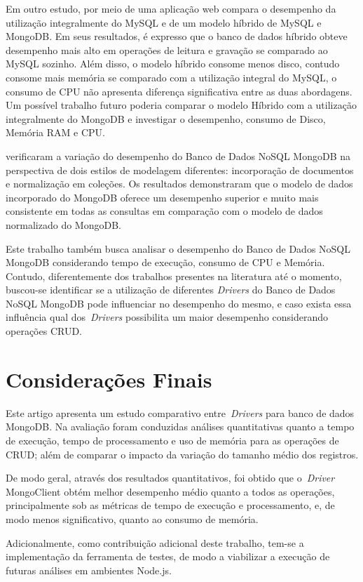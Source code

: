 \documentclass[12pt]{article}
\begin{document}
Em outro estudo, \cite{ongo:2018} por meio de uma aplicação web compara o desempenho da utilização integralmente do MySQL e de um modelo híbrido de MySQL e MongoDB. Em seus resultados, é expresso que o banco de dados híbrido obteve desempenho mais alto em operações de leitura e gravação se comparado ao MySQL sozinho. Além disso, o modelo híbrido consome menos disco, contudo consome mais memória se comparado com a utilização integral do MySQL, o consumo de CPU não apresenta diferença significativa entre as duas abordagens. Um possível trabalho futuro poderia comparar o modelo Híbrido com a utilização integralmente do MongoDB e investigar o desempenho, consumo de Disco, Memória RAM e CPU.

\cite{kanade2014study} verificaram a variação do desempenho do Banco de Dados NoSQL MongoDB na perspectiva de dois estilos de modelagem diferentes: incorporação de documentos e normalização em coleções. Os resultados demonstraram que o modelo de dados incorporado do MongoDB oferece um desempenho superior e muito mais consistente em todas as consultas em comparação com o modelo de dados normalizado do MongoDB.

Este trabalho também busca analisar o desempenho do Banco de Dados NoSQL MongoDB considerando tempo de execução, consumo de CPU e Memória. Contudo, diferentemente dos trabalhos presentes na literatura até o momento, buscou-se identificar se a utilização de diferentes \emph{Drivers} do Banco de Dados NoSQL MongoDB pode influenciar no desempenho do mesmo, e caso exista essa influência qual dos~\emph{Drivers} possibilita um maior desempenho considerando operações CRUD.

\section{Considerações Finais}
\label{section:consideracoes}

Este artigo apresenta um estudo comparativo entre~\emph{Drivers} para banco de dados MongoDB.
Na avaliação foram conduzidas análises quantitativas quanto a tempo de execução, tempo de processamento e uso de memória para as operações de CRUD; além de comparar o impacto da variação do tamanho médio dos registros.

De modo geral, através dos resultados quantitativos, foi obtido que o~\emph{Driver} MongoClient obtém melhor desempenho médio quanto a todos as operações, principalmente sob as métricas de tempo de execução e processamento, e, de modo menos significativo, quanto ao consumo de memória.

Adicionalmente, como contribuição adicional deste trabalho, tem-se a implementação da ferramenta de testes, de modo a viabilizar a execução de futuras análises em ambientes Node.js.




\end{document}
